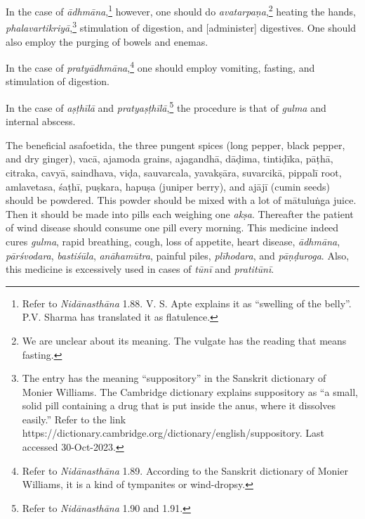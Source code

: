 \begin{translation}
\begin{tt}
In the case of \textit{ādhmāna},\footnote{Refer to
    \textit{Nidānasthāna} 1.88. V. S. Apte explains it as
    \enquote{swelling of the belly}. P.V. Sharma has translated it as
    flatulence.} however, one should do \textit{avatarpaṇa},\footnote{We
        are unclear about its meaning. The vulgate has the reading
         that means fasting.} heating the hands,
        \textit{phalavartikriyā},\footnote{The entry  has the
            meaning \enquote{suppository} in the Sanskrit dictionary of Monier
            Williams. The Cambridge dictionary explains suppository as \enquote{a
            small, solid pill containing a drug that is put inside the anus, where
            it dissolves easily.} Refer to the link
            https://dictionary.cambridge.org/dictionary/english/suppository. Last
            accessed 30-Oct-2023.} stimulation of digestion, and [administer]
            digestives. One should also employ the purging of bowels and enemas.

In the case of \textit{pratyādhmāna},\footnote{Refer to
    \textit{Nidānasthāna} 1.89. According to the Sanskrit dictionary of
    Monier Williams, it is a kind of tympanites or wind-dropsy.} one
    should employ vomiting, fasting, and stimulation of digestion.

\item[27]

In the case of \textit{aṣṭhīlā} and
\textit{pratyaṣṭhīlā},\footnote{Refer to \textit{Nidānasthāna} 1.90
    and 1.91.} the procedure is that of \textit{gulma} and internal
    abscess.

\item[28]

The beneficial asafoetida, the three pungent spices (long pepper,
black pepper, and dry ginger), \gls{vacā}, \gls{ajamoda} grains,
\gls{ajagandhā}, \gls{dāḍima}, \gls{tintiḍīka}, \gls{pāṭhā},
\gls{citraka}, \gls{cavyā}, \gls{saindhava}, \gls{viḍa},
\gls{sauvarcala}, \gls{yavakṣāra}, \gls{suvarcikā}, \gls{pippalī}
root, \gls{amlavetasa}, \gls{śaṭhī}, \gls{puṣkara}, \gls{hapuṣa}
(juniper berry), and \gls{ajājī} (cumin seeds) should be powdered.
This powder should be mixed with a lot of \gls{mātuluṅga} juice. Then
it should be made into pills each weighing one \textit{akṣa}.
Thereafter the patient of wind disease should consume one pill every
morning. This medicine indeed cures \textit{gulma}, rapid breathing,
cough, loss of appetite, heart disease, \textit{ādhmāna},
\textit{pārśvodara}, \textit{bastiśūla}, \textit{anāhamūtra}, painful
piles, \textit{plīhodara}, and \textit{pāṇḍuroga}. Also, this medicine
is excessively used in cases of \textit{tūnī} and \textit{pratitūnī}.


\end{tt}
\end{translation}
